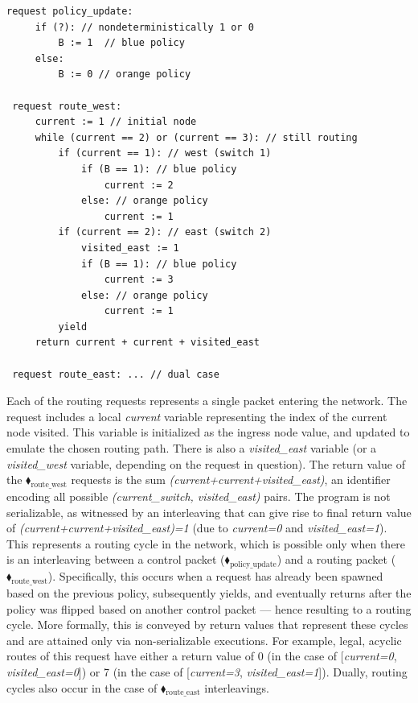 \begin{center}
\begin{minipage}[!htbp]{0.85\textwidth}
	\begin{lstlisting}[caption={BGP routing (not serializable)},label={lst:BgpNonSerializable},numbers=none]
 request policy_update:
     if (?): // nondeterministically 1 or 0
         B := 1  // blue policy 
     else:
         B := 0 // orange policy
		
 request route_west:
     current := 1 // initial node
     while (current == 2) or (current == 3): // still routing        
         if (current == 1): // west (switch 1)
             if (B == 1): // blue policy
                 current := 2
             else: // orange policy
                 current := 1
         if (current == 2): // east (switch 2)
             visited_east := 1
             if (B == 1): // blue policy
                 current := 3
             else: // orange policy
                 current := 1
         yield
     return current + current + visited_east
     
 request route_east: ... // dual case      
		\end{lstlisting}
\end{minipage}
\end{center}


Each of the routing requests represents a single packet entering the network. The request includes a local \textit{current} variable representing the index of the current node visited. This variable is initialized as the ingress node value, and updated to emulate the chosen routing path. There is also a \textit{visited\_east} variable (or a \textit{visited\_west} variable, depending on the request in question).
%
The return value of the {\color{ForestGreen}$\blacklozenge_\text{route\_west}$} requests is the sum \textit{(current+current+visited\_east)}, an identifier encoding all possible \textit{(current\_switch, visited\_east)} pairs.
%
The program is not serializable, as witnessed by an interleaving that can give rise to final return value of \textit{(current+current+visited\_east)=1} (due to \textit{current=0} and \textit{visited\_east=1}). This represents a routing cycle in the network, which is possible only when there is an interleaving between a control packet ({\color{ForestGreen}$\blacklozenge_\text{policy\_update}$}) and a routing packet ({\color{ForestGreen}$\blacklozenge_\text{route\_west}$}). Specifically, this occurs when  a request has already been spawned based on the previous policy, subsequently yields, and eventually returns after the policy was flipped based on another control packet --- hence resulting to a routing cycle.
%
More formally, this is conveyed by return values that represent these cycles and are attained only via non-serializable executions. For example, legal, acyclic routes of this request have either a return value of 0 (in the case of [\textit{current=0}, \textit{visited\_east=0}]) or 7 (in the case of [\textit{current=3}, \textit{visited\_east=1}]).
Dually, routing cycles also occur in the case of {\color{ForestGreen}$\blacklozenge_\text{route\_east}$} interleavings.


